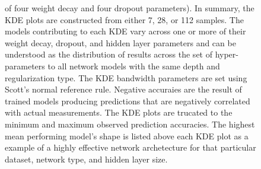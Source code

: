 \begin{figure}[htbp]
{             of four weight decay and four dropout parameters). In summary, the KDE 
             plots are constructed from either 7, 28, or 112 samples. 
             The models contributing to each KDE vary across one or more 
             of their weight decay, dropout, and hidden layer parameters and can be 
             understood as the distribution of results across the set of 
             hyper-parameters to all network models with the same depth and regularization
             type. The KDE bandwidth parameters are set using Scott's normal reference rule. 
             Negative accuraies are the result of trained models producing predictions that 
             are negatively correlated with actual measurements. The KDE plots are 
             trucated to the minimum and maximum observed prediction accuracies. The 
             highest mean performing model's shape is listed above each KDE plot as a 
             example of a highly effective network archetecture for that particular dataset, 
             network type, and hidden layer size.} 
\label{fig:depth-comparison}
\end{figure}

